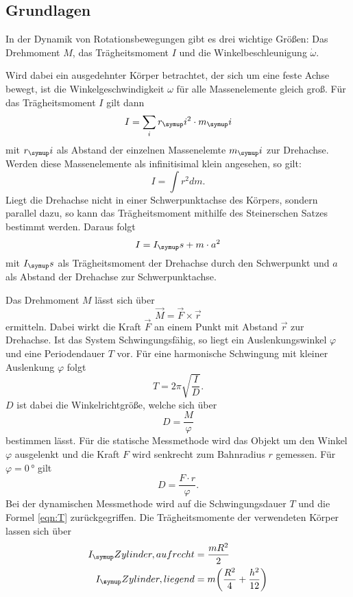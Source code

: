 \subsection{Grundlagen}
In der Dynamik von Rotationsbewegungen gibt es drei wichtige Größen:
Das Drehmoment $M$, das Trägheitsmoment $I$ und die Winkelbeschleunigung $\dot
\omega$.

Wird dabei ein ausgedehnter Körper betrachtet, der sich um eine feste Achse bewegt,
ist die Winkelgeschwindigkeit $\omega$ für alle Massenelemente gleich groß.
Für das Trägheitsmoment $I$ gilt dann
\begin{equation}
  I = \sum_i r_\su{i}^2 \cdot m_\su{i}
\end{equation}
mit $r_\su{i}$ als Abstand der einzelnen Massenelemte $m_\su{i}$ zur Drehachse.
Werden diese Massenelemente als infinitisimal klein angesehen, so gilt:
\begin{equation}
  I = \int r^2dm.
\end{equation}
Liegt die Drehachse nicht in einer Schwerpunktachse des Körpers, sondern parallel dazu,
so kann das Trägheitsmoment mithilfe des Steinerschen Satzes bestimmt werden.
Daraus folgt
\begin{equation}
  I = I_\su{s} + m \cdot a^2
\end{equation}
mit $I_\su{s}$ als Trägheitsmoment der Drehachse durch den Schwerpunkt und $a$ als
Abstand der Drehachse zur Schwerpunktachse.

Das Drehmoment $M$ lässt sich über
\begin{equation}
  \vec{M} = \vec{F} \times \vec{r} \label{eqn:M}
\end{equation}
ermitteln. Dabei wirkt die Kraft $\vec{F}$ an einem Punkt mit Abstand $\vec{r}$
zur Drehachse.
Ist das System Schwingungsfähig, so liegt ein Auslenkungswinkel $\varphi$ und eine
Periodendauer $T$ vor. Für eine harmonische Schwingung mit kleiner Auslenkung $\varphi$
folgt
\begin{equation}
  T = 2\pi\sqrt{\frac{I}{D}}. \label{eqn:T}
\end{equation}
$D$ ist dabei die Winkelrichtgröße, welche sich über
\begin{equation}
  D = \frac{M}{\varphi}
\end{equation}
bestimmen lässt.
Für die statische Messmethode wird das Objekt um den Winkel $\varphi$ ausgelenkt
und die Kraft $F$ wird senkrecht zum Bahnradius $r$ gemessen. Für $\varphi = 0 \,\si{\degree}$
gilt
\begin{equation}
  D = \frac{F \cdot r}{\varphi}. \label{eqn:D}
\end{equation}
Bei der dynamischen Messmethode wird auf die Schwingungsdauer $T$ und die Formel
\eqref{eqn:T} zurückgegriffen.
Die Trägheitsmomente der verwendeten Körper lassen sich über
\begin{align}
  \begin{split}
    I_\su{Zylinder, aufrecht} &= \frac{mR^2}{2} \\
    I_\su{Zylinder, liegend}  &= m\biggl(\frac{R^2}{4}+\frac{h^2}{12}\biggr)
  \end{split}
  \label{eqn:ZylI}
\end{align}
\newpage
